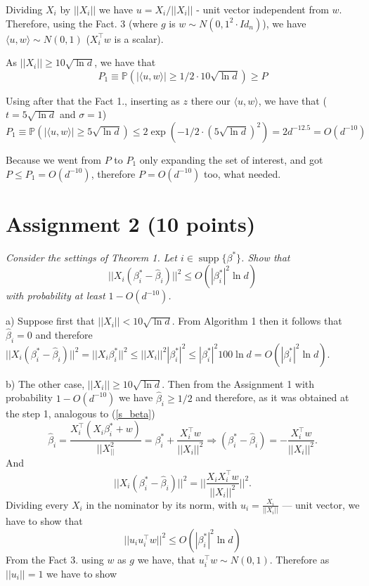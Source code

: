 \documentclass[]{article}
\DeclareMathOperator\supp{supp}
\begin{document}
Dividing $X_i$ by $||X_i||$ we have $u=X_i/||X_i||$ - unit vector independent from $w$. Therefore, using the Fact. 3 (where $g$ is $w\sim N(0, 1^2\cdot Id_n)$), we have $\langle u, w \rangle \sim N(0, 1)$ ($X_i ^\top w$ is a scalar). 

As $||X_i|| \ge 10\sqrt{\ln d}$, we have that 
$$P_1 \equiv \mathbb{P}(|\langle u, w \rangle| \ge 1/2\cdot 10\sqrt{\ln d}) \ge P$$

Using after that the Fact 1., inserting as $z$ there our $\langle u, w \rangle$, we have that ($t=5\sqrt{\ln d}$ and $\sigma = 1$)
$$P_1 \equiv \mathbb{P}(|\langle u, w \rangle| \ge 5\sqrt{\ln d}) \le 2\exp(-1/2\cdot (5\sqrt{\ln d})^2)=2d^{-12.5}=O(d^{-10})$$

Because we went from $P$ to $P_1$ only expanding the set of interest, and got $P \le P_1 = O(d^{-10})$, therefore $P = O(d^{-10})$ too, what needed.

\section*{Assignment 2 (10 points)}
\textit{Consider the settings of Theorem 1. Let $i \in \supp\{\beta^*\}$. Show that 
	$$||X_i(\beta_i^* - \hat{\beta}_i)||^2 
	\le O(|\beta_i^*|^2\ln d)$$
	with probability at least $1 - O(d^{-10})$.}

a) Suppose first that $||X_i|| < 10\sqrt{\ln d}.$ From Algorithm 1 then it follows that $\hat{\beta}_i=0$ and therefore $||X_i(\beta_i^*-\hat{\beta}_i)||^2 = ||X_i\beta_i^*||^2 \le ||X_i||^2 |\beta_i^*|^2 \le |\beta_i^*|^2 100\ln d   = O(|\beta_i^*|^2 \ln d)$.

b) The other case, $||X_i|| \ge 10\sqrt{\ln d}$. Then from the Assignment 1 with probability $1-O(d^{-10})$ we have $\hat{\beta}_i\ge 1/2$ and therefore, as it was obtained at the step 1, analogous to (\ref{s_beta})
$$\hat{\beta}_i = \frac{X_i^\top(X_i\beta_i^*+w)}{||X_||^2} =  \beta_i^* + \frac{X_i^\top w}{||X_i||^2} \Rightarrow (\beta_i^* - \hat{\beta}_i) = -\frac{X_i^\top w}{||X_i||^2}.$$
And
$$||X_i(\beta_i^* - \hat{\beta}_i)||^2 = \bigg\lvert\bigg\lvert\frac{X_iX_i^\top w}{||X_i||^2}\bigg\rvert\bigg\rvert^2.$$
Dividing every $X_i$ in the nominator by its norm, with $u_i=\frac{X_i}{||X_i||}$ --- unit vector, we have to show that
$$||u_iu_i^\top w||^2 \le O(|\beta_i^*|^2 \ln d)$$
From the Fact 3. using $w$ as $g$ we have, that $u_i^\top w \sim N(0, 1)$. Therefore as $||u_i||=1$ we have to show
\end{document}

